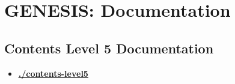 \documentclass[12pt]{article}
\begin{document}
\section*{GENESIS: Documentation}

\subsection*{Contents Level 5 Documentation}

\begin{itemize}

\item \href{.././contents-level5/./contents-level5.pdf}{\bf \underline{./contents-level5}}


\end{itemize}

\end{document}
